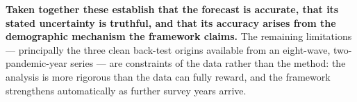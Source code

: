 \documentclass[ %
                    author={Ashrey Ashrey, Sanya Kapoor, Trisha Sharma, Yash Bhooshan Pandloskar},
                supervisor={Dr. Dalila O’Grady},
                    degree={MSc},
                     title={Using machine learning to forecast physical activity participation, volunteering and activity patterns in London},
                  subtitle={},
                      type={},
                      year={2021}]{dissertation}
\begin{document}
\noindent
\textbf{Taken together these establish that the forecast is accurate, that its stated uncertainty is truthful, and that its accuracy arises from the demographic mechanism the framework claims.} The remaining limitations --- principally the three clean back-test origins available from an eight-wave, two-pandemic-year series --- are constraints of the data rather than the method: the analysis is more rigorous than the data can fully reward, and the framework strengthens automatically as further survey years arrive.


\end{document}
